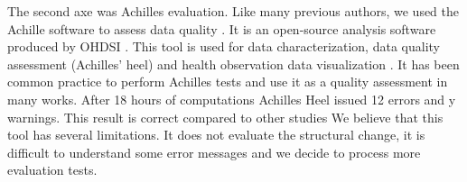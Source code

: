 The second axe was Achilles evaluation. Like many previous authors, we used the
Achille software to assess data quality \cite{achilles-evaluation}.  It is an
open-source analysis software produced by OHDSI \cite{ohdsi-achilles}.  This
tool is used for data characterization, data quality assessment (Achilles'
heel) and health observation data visualization \cite{ohdsi-achilles}.  It has
been common practice to perform Achilles tests and use it as a quality
assessment in many works. After 18 hours of computations Achilles Heel issued
12 errors and y warnings.  This result is correct compared to other studies
\cite{achilles-evaluation} We believe that this tool has several limitations.
It does not evaluate the structural change, it is difficult to understand some
error messages and we decide to process more evaluation tests. 
